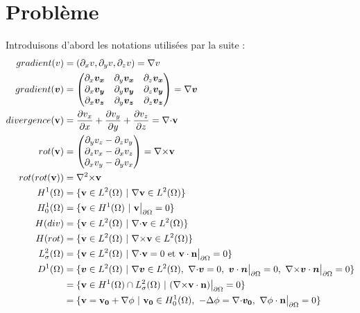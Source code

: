 \part{Problème}
\label{partProb}
Introduisons d'abord les notations utilisées par la suite :
\begin{align*}
gradient(v)&=(\partial_x v, \partial_y v, \partial_z v)=\grad v\\
gradient(\bm{v})&=\begin{pmatrix}
\partial_x \bm{v_x} & \partial_y \bm{v_x} & \partial_z \bm{v_x}\\
\partial_x \bm{v_y} & \partial_y \bm{v_y} & \partial_z \bm{v_y}\\
\partial_x \bm{v_z} & \partial_y \bm{v_z} & \partial_z \bm{v_z}
\end{pmatrix}=\grad\bm{v}\\
divergence(\mathbf{v})&=\frac{\partial v_x}{\partial x}+\frac{\partial v_y}{\partial y}+\frac{\partial v_z}{\partial z}=\div \mathbf{v}\\
rot(\mathbf{v})&=\begin{pmatrix}
\partial_y v_z - \partial_z v_y\\
\partial_z v_x - \partial_x v_z\\
\partial_x v_y - \partial_y v_x
\end{pmatrix}=\rot \mathbf{v}\\
rot(rot(\mathbf{v}))&=\rott \mathbf{v}\\
H^1(\Omega) &= \{\mathbf{v} \in L^2(\Omega)\ |\ \grad \mathbf{v}\in L^2(\Omega)\}\\
H^1_0(\Omega) &= \{\mathbf{v} \in H^1(\Omega)\ |\ \mathbf{v}\restr = 0\}\\
H(div) &= \{\mathbf{v} \in L^2(\Omega)\ |\ \div\mathbf{v} \in L^2(\Omega) \}\\
H(rot) &= \{\mathbf{v} \in L^2(\Omega)\ |\ \rot\mathbf{v} \in L^2(\Omega) \}\\
L^2_\sigma(\Omega) &= \{\mathbf{v} \in L^2(\Omega)\ |\ \div \mathbf{v} = 0\text{ et }\mathbf{v}\cdot \mathbf{n}\restr = 0 \}\\
D^1(\Omega) &=\{\bm{v}\in L^2(\Omega)\ |\ \grad\bm{v}\in L^2(\Omega),\ \div\bm{v}=0,\ \bm{v}\cdot\bm{n}\restr = 0,\ \rot\bm{v}\cdot\bm{n}\restr = 0\}\\
&= \{\mathbf{v} \in H^1(\Omega)\cap L^2_\sigma(\Omega)\ |\ (\rot \mathbf{v}\cdot \mathbf{n})\restr = 0  \}\\
&=\{\mathbf{v}=\mathbf{v_0}+\grad\phi\ |\ \mathbf{v_0}\in H^1_0(\Omega),\ -\laplace\phi=\div\bm{v_0},\ \grad\phi\cdot \mathbf{n}\restr = 0 \}
\end{align*}

